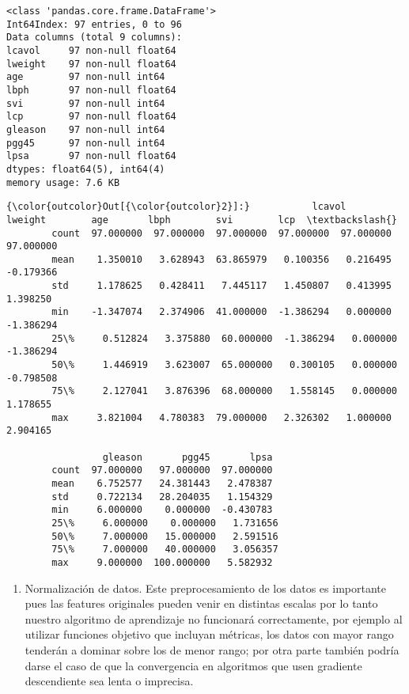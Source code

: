 \documentclass[11pt]{article}
\begin{document}
    \begin{Verbatim}[commandchars=\\\{\}]
<class 'pandas.core.frame.DataFrame'>
Int64Index: 97 entries, 0 to 96
Data columns (total 9 columns):
lcavol     97 non-null float64
lweight    97 non-null float64
age        97 non-null int64
lbph       97 non-null float64
svi        97 non-null int64
lcp        97 non-null float64
gleason    97 non-null int64
pgg45      97 non-null int64
lpsa       97 non-null float64
dtypes: float64(5), int64(4)
memory usage: 7.6 KB

    \end{Verbatim}

            \begin{Verbatim}[commandchars=\\\{\}]
{\color{outcolor}Out[{\color{outcolor}2}]:}           lcavol    lweight        age       lbph        svi        lcp  \textbackslash{}
        count  97.000000  97.000000  97.000000  97.000000  97.000000  97.000000   
        mean    1.350010   3.628943  63.865979   0.100356   0.216495  -0.179366   
        std     1.178625   0.428411   7.445117   1.450807   0.413995   1.398250   
        min    -1.347074   2.374906  41.000000  -1.386294   0.000000  -1.386294   
        25\%     0.512824   3.375880  60.000000  -1.386294   0.000000  -1.386294   
        50\%     1.446919   3.623007  65.000000   0.300105   0.000000  -0.798508   
        75\%     2.127041   3.876396  68.000000   1.558145   0.000000   1.178655   
        max     3.821004   4.780383  79.000000   2.326302   1.000000   2.904165   
        
                 gleason       pgg45       lpsa  
        count  97.000000   97.000000  97.000000  
        mean    6.752577   24.381443   2.478387  
        std     0.722134   28.204035   1.154329  
        min     6.000000    0.000000  -0.430783  
        25\%     6.000000    0.000000   1.731656  
        50\%     7.000000   15.000000   2.591516  
        75\%     7.000000   40.000000   3.056357  
        max     9.000000  100.000000   5.582932  
\end{Verbatim}
        
    \begin{enumerate}
\def\labelenumi{(\alph{enumi})}
\setcounter{enumi}{2}
\itemsep1pt\parskip0pt
\item
  Normalización de datos. Este preprocesamiento de los datos es
  importante pues las features originales pueden venir en distintas
  escalas por lo tanto nuestro algoritmo de aprendizaje no funcionará
  correctamente, por ejemplo al utilizar funciones objetivo que incluyan
  métricas, los datos con mayor rango tenderán a dominar sobre los de
  menor rango; por otra parte también podría darse el caso de que la
  convergencia en algoritmos que usen gradiente descendiente sea lenta o
  imprecisa.
\end{enumerate}
\end{document}
